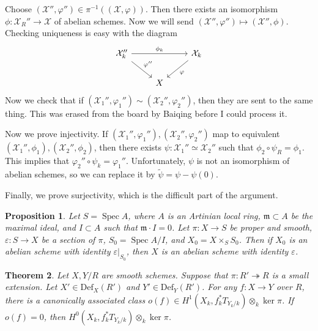 \documentclass[leqno, openany]{memoir}
\newtheorem{thm}{Theorem}[section]
\newtheorem{prop}[thm]{Proposition}
\theoremstyle{definition}
\theoremstyle{remark}
\theoremstyle{plain}
\theoremstyle{definition}
\theoremstyle{remark}
\newcommand{\ep}{\varepsilon}
\newcommand{\mc}[1]{\mathcal{#1}}
\newcommand{\mf}[1]{\mathfrak{#1}}
\newcommand{\mr}[1]{\mathrm{#1}}
\newcommand{\wt}[1]{\widetilde{#1}}
\DeclareMathOperator{\Spec}{Spec}
\begin{document}
Choose $(\mc{X}'', \varphi'') \in \pi^{-1}((\mc{X}, \varphi))$. Then there exists an isomorphism $\phi \colon \mc{X}_R'' \to \mc{X}$ of abelian schemes. Now we will send $(\mc{X}'', \varphi'') \mapsto (\mc{X}'', \phi)$. Checking uniqueness is easy with the diagram
\begin{equation*}
\begin{tikzcd}
    \mc{X}_k'' \ar{rr}{\phi_k} \ar{dr}{\varphi''} && \mc{X}_k \ar{dl}{\varphi} \\
    & X
\end{tikzcd}
\end{equation*}
Now we check that if $(\mc{X}_1'', \varphi_1'') \sim (\mc{X}_2'', \varphi_2'')$, then they are sent to the same thing. This was erased from the board by Baiqing before I could process it.

    Now we prove injectivity. If $(\mc{X}_1'', \varphi_1''), (\mc{X}_2'', \varphi_2'')$ map to equivalent $(\mc{X}_1'', \phi_1), (\mc{X}_2'', \phi_2)$, then there exists $\psi \colon \mc{X}_1'' \simeq \mc{X}_2''$ such that $\phi_2 \circ \psi_R = \phi_1$. This implies that $\varphi_2'' \circ \psi_k = \varphi_1''$. Unfortunately, $\psi$ is not an isomorphism of abelian schemes, so we can replace it by $\wt{\psi} = \psi - \psi(0)$.

Finally, we prove surjectivity, which is the difficult part of the argument.
\begin{prop}
    Let $S = \Spec A$, where $A$ is an Artinian local ring, $\mf{m} \subset A$ be the maximal ideal, and $I \subset A$ such that $\mf{m} \cdot I = 0$. Let $\pi \colon X \to S$ be proper and smooth, $\ep \colon S \to X$ be a section of $\pi$, $S_0 = \Spec A/I$, and $X_0 = X \times_S S_0$. Then if $X_0$ is an abelian scheme with identity $\ep |_{S_0}$, then $X$ is an abelian scheme with identity $\ep$.
\end{prop}

\begin{thm}
    Let $X, Y/R$ are smooth schemes. Suppose that $\pi \colon R' \twoheadrightarrow R$ is a small extension. Let $X' \in \mr{Def}_X(R')$ and $Y' \in \mr{Def}_Y(R')$. For any $f \colon X \to Y$ over $R$, there is a canonically associated class $o(f) \in H^1(X_k, f_k^* T_{Y_k/k}) \otimes_k \ker \pi$. If $o(f) = 0$, then $H^0(X_k, f_k^* T_{Y_k/k}) \otimes_k \ker \pi$.
\end{thm}
\end{document}
